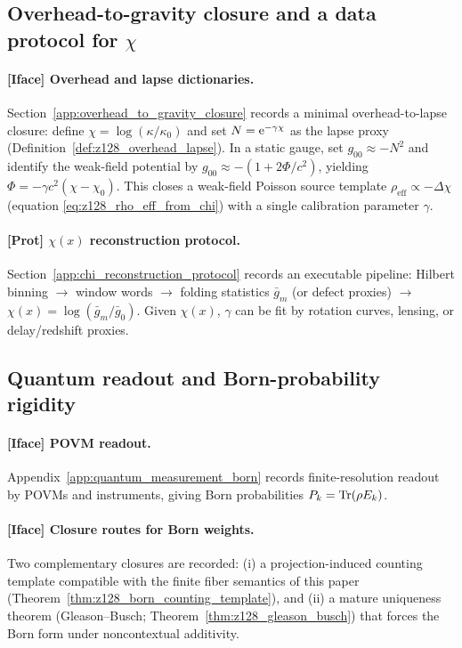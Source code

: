 \subsection{Overhead-to-gravity closure and a data protocol for \texorpdfstring{$\chi$}{chi}}
\label{subsec:tick_cap_overhead_gravity}

\paragraph{[Iface] Overhead and lapse dictionaries.}
Section~\ref{app:overhead_to_gravity_closure} records a minimal overhead-to-lapse closure:
define $\chi=\log(\kappa/\kappa_0)$ and set $N=\mathrm{e}^{-\gamma\chi}$ as the lapse proxy (Definition~\ref{def:z128_overhead_lapse}).
In a static gauge, set $g_{00}\approx -N^2$ and identify the weak-field potential by $g_{00}\approx -(1+2\Phi/c^2)$, yielding $\Phi=-\gamma c^2(\chi-\chi_0)$.
This closes a weak-field Poisson source template $\rho_{\mathrm{eff}}\propto -\Delta\chi$ (equation \eqref{eq:z128_rho_eff_from_chi}) with a single calibration parameter $\gamma$.

\paragraph{[Prot] \texorpdfstring{$\chi(x)$}{chi(x)} reconstruction protocol.}
Section~\ref{app:chi_reconstruction_protocol} records an executable pipeline:
Hilbert binning $\to$ window words $\to$ folding statistics $\bar g_m$ (or defect proxies) $\to$ $\chi(x)=\log(\bar g_m/\bar g_0)$.
Given $\chi(x)$, $\gamma$ can be fit by rotation curves, lensing, or delay/redshift proxies.

\subsection{Quantum readout and Born-probability rigidity}
\label{subsec:tick_cap_quantum_born}

\paragraph{[Iface] POVM readout.}
Appendix~\ref{app:quantum_measurement_born} records finite-resolution readout by POVMs and instruments, giving Born probabilities $P_k=\mathrm{Tr}(\rho E_k)$.

\paragraph{[Iface] Closure routes for Born weights.}
Two complementary closures are recorded: (i) a projection-induced counting template compatible with the finite fiber semantics of this paper (Theorem~\ref{thm:z128_born_counting_template}), and (ii) a mature uniqueness theorem (Gleason--Busch; Theorem~\ref{thm:z128_gleason_busch}) that forces the Born form under noncontextual additivity.

